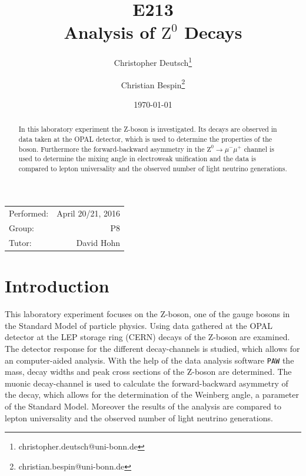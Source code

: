 \documentclass[11pt, a4paper]{article}
\title{E213 \\ Analysis of $\mathrm{Z}^0$ Decays}
\author{Christopher Deutsch\footnote{christopher.deutsch@uni-bonn.de} \and Christian Bespin\footnote{christian.bespin@uni-bonn.de}}
\date{\today}
\numberwithin{equation}{section}
\begin{document}
\begin{titlepage}

\maketitle

\begin{center}
\begin{tabular}{l r}
Performed: & April 20/21, 2016 \\
Group: & P8 \\
Tutor: & David Hohn
\end{tabular}
\end{center}

\begin{abstract}
	\noindent In this laboratory experiment the Z-boson is investigated.
	Its decays are observed in data taken at the OPAL detector, which is used to determine the properties of the boson.
	Furthermore the forward-backward asymmetry in the $\mathrm{Z}^0 \rightarrow \mu^- \mu^+$ channel is used to determine the mixing angle in electroweak unification and the data is compared to lepton universality and the observed number of light neutrino generations.
\end{abstract}

\end{titlepage}

\tableofcontents
\newpage

\section{Introduction}

This laboratory experiment focuses on the Z-boson, one of the gauge bosons in the Standard Model of particle physics.
Using data gathered at the OPAL detector at the LEP storage ring (CERN) decays of the Z-boson are examined.
The detector response for the different decay-channels is studied, which allows for an computer-aided analysis.
With the help of the data analysis software \texttt{PAW} the mass, decay widths and peak cross sections of the Z-boson are determined.
The muonic decay-channel is used to calculate the forward-backward asymmetry of the decay, which allows for the determination of the Weinberg angle, a parameter of the Standard Model.
Moreover the results of the analysis are compared to lepton universality and the observed number of light neutrino generations.
\end{document}
